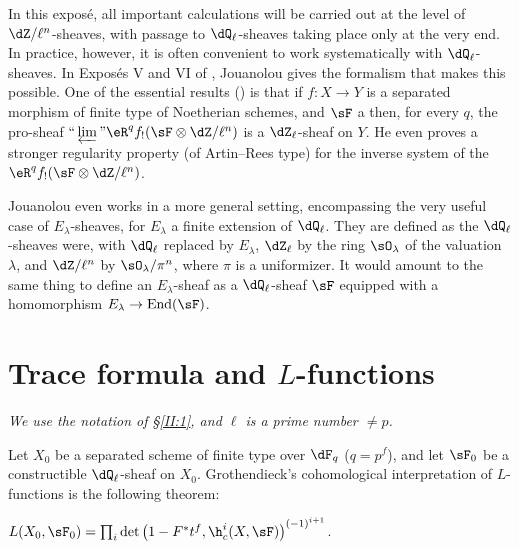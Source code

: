 In this exposé, all important calculations will be carried out at the level
of $\dZ/\ell^n$-sheaves, with passage to $\dQ_\ell$-sheaves taking place only
at the very end. In practice, however, it is often convenient to work
systematically with $\dQ_\ell$-sheaves. In Exposés V and VI of
, Jouanolou gives the formalism that makes this possible. One of
the essential results () is that if $f:X\to Y$ is a separated morphism
of finite type of Noetherian schemes, and $\sF$ a 
then, for every $q$, the pro-sheaf
$\text{``}\varprojlim\text{''}\eR^q f_! (\sF\otimes\dZ/\ell^n)$ is a
$\dZ_\ell$-sheaf on $Y$. He even proves a stronger regularity property (of
Artin--Rees type) for the inverse system of the
$\eR^q f_!(\sF\otimes\dZ/\ell^n)$.

Jouanolou even works in a more general setting, encompassing the very useful
case of $E_\lambda$-sheaves, for $E_\lambda$ a finite extension of
$\dQ_\ell$. They are defined as the $\dQ_\ell$-sheaves were, with
$\dQ_\ell$ replaced by $E_\lambda$, $\dZ_\ell$ by the ring $\sO_\lambda$ of
the valuation $\lambda$, and $\dZ/\ell^n$ by $\sO_\lambda/\pi^n$, where
$\pi$ is a uniformizer. It would amount to the same thing to define an
$E_\lambda$-sheaf as a $\dQ_\ell$-sheaf $\sF$ equipped with a homomorphism
$E_\lambda\to\operatorname{End}(\sF)$.









\section{Trace formula and \texorpdfstring{$L$}{L}-functions}\label{II:3}

\emph{We use the notation of \S\ref{II:1}, and $\ell$ is a prime number
$\ne p$.}

Let $X_0$ be a separated scheme of finite type over $\dF_q$ ($q=p^f$), and
let $\sF_0$ be a constructible $\dQ_\ell$-sheaf on $X_0$. Grothendieck's
cohomological interpretation of $L$-functions is the following theorem:






\begin{theorem_}\label{II:3-1}
$L(X_0,\sF_0) = \prod_i \det\left(1-F^* t^f, \h_c^i(X,\sF)\right)^{(-1)^{i+1}}$.
\end{theorem_}

